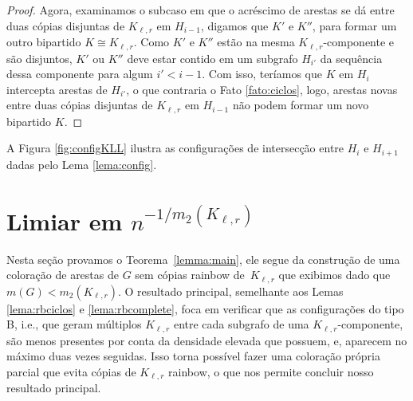 \documentclass[12pt,a4paper]{book}
\newcommand{\K}{K_{\ell,r}} %
\begin{document}
\begin{proof}
   Agora, examinamos o subcaso em que o acréscimo de arestas se dá entre duas cópias disjuntas de $\K$ em $H_{i-1}$, digamos que $K'$ e $K''$, para formar um outro bipartido $K\cong\K$.
    Como $K'$ e $K''$ estão na mesma $\K$-componente e são disjuntos, $K'$ ou $K''$ deve estar contido em um subgrafo $H_{i'}$ da sequência dessa componente para algum $i'<i-1$.
    Com isso, teríamos que $K$ em $H_i$ intercepta arestas de $H_{i'}$, o que contraria o Fato \ref{fato:ciclos}, logo, arestas novas entre duas cópias disjuntas de $\K$ em $H_{i-1}$ não podem formar um novo bipartido $K$.

\end{proof}
  
  A Figura \ref{fig:configKLL} ilustra as configurações de intersecção entre $H_i$ e $H_{i+1}$ dadas pelo Lema \ref{lema:config}.

\section{Limiar em $n^{-1/m_2(K_{\ell,r})}$}
\label{sec:mainres}

Nesta seção provamos o Teorema~\ref{lemma:main}, ele segue da construção de uma coloração de arestas de $G$ sem cópias rainbow de~$\K$ que exibimos dado que $m(G) < m_2(\K)$.
O resultado principal, semelhante aos Lemas \ref{lema:rbciclos} e \ref{lema:rbcomplete}, foca em verificar que as configurações do tipo B, i.e., que geram múltiplos $\K$ entre cada subgrafo de uma $\K$-componente, são menos presentes por conta da densidade elevada que possuem, e, aparecem no máximo duas vezes seguidas. 
  Isso torna possível fazer uma coloração própria parcial  que evita cópias de $\K$ rainbow, o que nos permite concluir nosso resultado principal.
  
\end{document}
